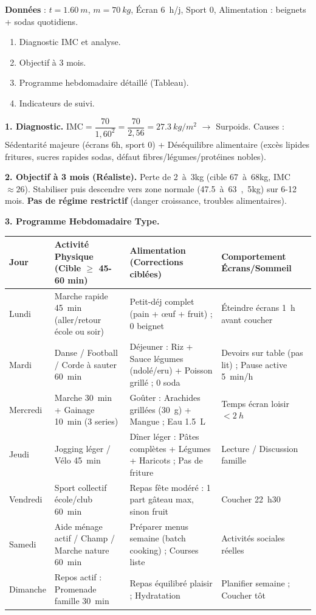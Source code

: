 \documentclass[11pt]{article}
\newcommand{\cle}[1]{{\popxbold\color{popdark}#1}}
\begin{document}
\begin{exoresolu}
\textbf{Données} : $t = \SI{1,60}{m}$, $m = \SI{70}{kg}$, Écran \SI{6}{h/j}, Sport 0, Alimentation : beignets + sodas quotidiens.
\begin{enumerate}
\item Diagnostic IMC et analyse.
\item Objectif à 3 mois.
\item Programme hebdomadaire détaillé (Tableau).
\item Indicateurs de suivi.
\end{enumerate}
\tcblower
\textbf{1. Diagnostic.}
$\mathrm{IMC} = \dfrac{70}{1,60^2} = \dfrac{70}{2,56} = \SI{27,3}{kg/m^2}$ $\rightarrow$ \cle{Surpoids}.
Causes : Sédentarité majeure (écrans 6h, sport 0) + Déséquilibre alimentaire (excès lipides fritures, sucres rapides sodas, défaut fibres/légumes/protéines nobles).

\textbf{2. Objectif à 3 mois (Réaliste).}
Perte de \SI{2}{à 3}{kg} (cible \SI{67}{à 68}{kg}, IMC $\approx 26$). Stabiliser puis descendre vers zone normale (\SI{47,5}{à 63,5}{kg}) sur 6-12 mois. \textbf{Pas de régime restrictif} (danger croissance, troubles alimentaires).

\textbf{3. Programme Hebdomadaire Type.}
\begin{center}
\begin{tabularx}{\linewidth}{|l|X|X|X|}\hline
\rowcolor{popblueL} \textbf{Jour} & \textbf{Activité Physique (Cible $\ge$ 45-60 min)} & \textbf{Alimentation (Corrections ciblées)} & \textbf{Comportement Écrans/Sommeil} \\ \hline
Lundi & Marche rapide \SI{45}{min} (aller/retour école ou soir) & Petit-déj complet (pain + œuf + fruit) ; 0 beignet & Éteindre écrans \SI{1}{h} avant coucher \\ \hline
Mardi & Danse / Football / Corde à sauter \SI{60}{min} & Déjeuner : Riz + Sauce légumes (ndolé/eru) + Poisson grillé ; 0 soda & Devoirs sur table (pas lit) ; Pause active \SI{5}{min}/h \\ \hline
Mercredi & Marche \SI{30}{min} + Gainage \SI{10}{min} (3 series) & Goûter : Arachides grillées (\SI{30}{g}) + Mangue ; Eau \SI{1,5}{L} & Temps écran loisir $< \SI{2}{h}$ \\ \hline
Jeudi & Jogging léger / Vélo \SI{45}{min} & Dîner léger : Pâtes complètes + Légumes + Haricots ; Pas de friture & Lecture / Discussion famille \\ \hline
Vendredi & Sport collectif école/club \SI{60}{min} & Repas fête modéré : 1 part gâteau max, sinon fruit & Coucher \SI{22}{h}30 \\ \hline
Samedi & Aide ménage actif / Champ / Marche nature \SI{60}{min} & Préparer menus semaine (batch cooking) ; Courses liste & Activités sociales réelles \\ \hline
Dimanche & Repos actif : Promenade famille \SI{30}{min} & Repas équilibré plaisir ; Hydratation & Planifier semaine ; Coucher tôt \\ \hline
\end{tabularx}
\end{center}


\end{exoresolu}
\end{document}
